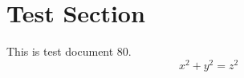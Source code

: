 \documentclass{article}
\begin{document}
\section{Test Section}
This is test document 80.
\begin{equation}
x^2 + y^2 = z^2
\end{equation}
\end{document}
